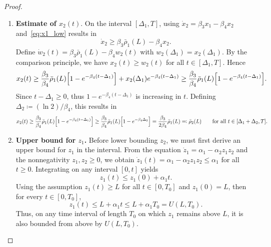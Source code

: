 \documentclass[10pt,a4paper]{amsart}
\begin{document}
\begin{proof}
\begin{enumerate}[leftmargin=*]
    \item \textbf{Estimate of $x_2(t)$}. On the interval $[\Delta_1,T]$, 
    using $\dot x_2=\beta_3 x_1-\beta_4 x_2$ and~\eqref{eq:x1_low} 
    results in
    \begin{equation*}
        \dot x_2 \ge \beta_3\bar\rho_1(L) - \beta_4 x_2.
    \end{equation*}
    Define $\dot w_2(t)=\beta_3\bar\rho_1(L)-\beta_4 w_2(t)$ with 
    $w_2(\Delta_1)=x_2(\Delta_1)$. By the comparison principle, we have 
    $x_2(t)\ge w_2(t)$ for all $t\in[\Delta_1,T]$. Hence
    \begin{equation*}
        x_2(t) \ge \frac{\beta_3}{\beta_4}\bar\rho_1(L)
        \Bigl[1-e^{-\beta_4(t-\Delta_1)}\Bigr]
        + x_2(\Delta_1)e^{-\beta_4(t-\Delta_1)}
        \ge \frac{\beta_3}{\beta_4}\bar\rho_1(L)
        \Bigl[1-e^{-\beta_4(t-\Delta_1)}\Bigr].
    \end{equation*}
    Since $t-\Delta_1\ge0$, thus $1-e^{-\beta_4(t-\Delta_1)}$ is increasing in $t$. Defining $\Delta_2\coloneqq(\ln 2)/\beta_4$, this results in
    \begin{equation}\label{eq:x2_low}
        x_2(t)\ge\frac{\beta_3}{\beta_4}\bar\rho_1(L)
        \Bigl[1-e^{-\beta_4(t-\Delta_1)}\Bigr] \ge 
        \frac{\beta_3}{\beta_4}\bar\rho_1(L)
        \Bigl[1-e^{-\beta_4\Delta_2}\Bigr]
        =\frac{\beta_3}{2\beta_4}\bar\rho_1(L)
        \eqqcolon \bar\rho_2(L) 
        \qquad\text{for all } t\in[\Delta_1+\Delta_2,T].
    \end{equation}

    \item \textbf{Upper bound for $z_1$.}
    Before lower bounding $z_2$, we must first derive an upper bound for 
    $z_1$ in the interval. From the equation $\dot z_1=\alpha_1-\alpha_2 
    z_1 z_2$ and the nonnegativity $z_1,z_2\ge 0$, we obtain
    $\dot z_1(t)=\alpha_1-\alpha_2 z_1 z_2\le\alpha_1$ for all $t\ge 0.$
    Integrating on any interval $[0,t]$ yields
    \begin{equation*}
        z_1(t) \le z_1(0) + \alpha_1 t.
    \end{equation*}
    Using the assumption $z_1(t)\ge L$ for all $t\in[0,T_0]$ and 
    $z_1(0)=L$, then for every $t\in[0,T_0]$,
    \begin{equation}\label{eq:z1_window}
        z_1(t)\le L+\alpha_1 t
        \le L+\alpha_1T_0 = U(L,T_0).
    \end{equation}
    Thus, on any time interval of length $T_0$ on which $z_1$ remains 
    above $L$, it is also bounded from above by $U(L,T_0)$.


\end{enumerate}
\end{proof}
\end{document}

